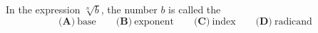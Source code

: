 In the expression $\sqrt[n]{b}$, the number $b$ is called the
\[\textbf{(A)}\ \text{base}\qquad\textbf{(B)}\ \text{exponent}\qquad\textbf{(C)}\ \text{index}\qquad\textbf{(D)}\ \text{radicand}\]
